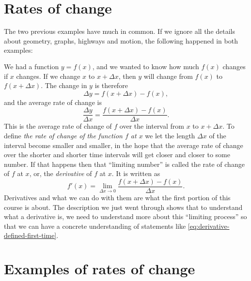 \section{Rates of change} 
\label{sec:rates-of-change} The two previous examples have much in common.  If
we ignore all the details about geometry, graphs, highways and motion, the
following happened in both examples:

We had a function $y=f(x)$, and we wanted to know how much $f(x)$ changes if $x$
changes.  If we change $x$ to $x+\Delta x$, then $y$ will change from $f(x)$ to
$f(x+\Delta x)$.  The change in $y$ is therefore
\[
\Delta y = f(x+\Delta x) - f(x),
\]
and the average rate of change is
\begin{equation} \label{eq:difference-quotient} \frac{\Delta y}{\Delta x} =
  \frac{f(x+\Delta x) - f(x)}{\Delta x}.
\end{equation}
This is the average rate of change of $f$ over the interval from $x$ to
$x+\Delta x$.  To define \emph{the rate of change of the function $f$ at $x$} we
let the length $\Delta x$ of the interval become smaller and smaller, in the
hope that the average rate of change over the shorter and shorter time intervals
will get closer and closer to some number.  If that happens then that ``limiting
number'' is called the rate of change of $f$ at $x$, or, the \emph{derivative}
of $f$ at $x$.  It is written as
\begin{equation}
  \label{eq:derivative-defined-first-time}
  f'(x) = \lim_{\Delta x\to 0}\frac{f(x+\Delta x) - f(x)}{\Delta x}.
\end{equation}
Derivatives and what we can do with them are what the first portion of this
course is about.  The description we just went through shows that to understand
what a derivative is, we need to understand more about this ``limiting process''
so that we can have a concrete understanding of statements like
\eqref{eq:derivative-defined-first-time}.

\section{Examples of rates of change} 

